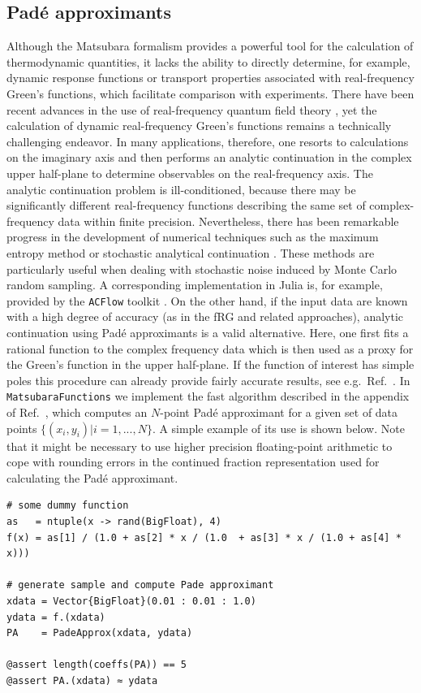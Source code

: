 \documentclass{SciPost}
\begin{document}
\subsection{Pad\'e approximants}
\label{subsec:pade}

Although the Matsubara formalism provides a powerful tool for the calculation of thermodynamic quantities, it lacks the ability to directly determine, for example, dynamic response functions or transport properties associated with real-frequency Green's functions, which facilitate comparison with experiments. There have been recent advances in the use of real-frequency quantum field theory \cite{jakobs2010, schimmel2017, weidinger2021, ge2023}, yet the calculation of dynamic real-frequency Green's functions remains a technically challenging endeavor. In many applications, therefore, one resorts to calculations on the imaginary axis and then performs an analytic continuation in the complex upper half-plane to determine observables on the real-frequency axis. The analytic continuation problem is ill-conditioned, because there may be significantly different real-frequency functions describing the same set of complex-frequency data within finite precision. Nevertheless, there has been remarkable progress in the development of numerical techniques such as the maximum entropy method \cite{jarell1996, bergeron2016, goulko2017} or stochastic analytical continuation \cite{beach2004, sandvik2016}. These methods are particularly useful when dealing with stochastic noise induced by Monte Carlo random sampling. A corresponding implementation in Julia is, for example, provided by the \texttt{ACFlow} toolkit \cite{huang2022}. On the other hand, if the input data are known with a high degree of accuracy (as in the fRG and related approaches), analytic continuation using Pad\'e approximants is a valid alternative. Here, one first fits a rational function to the complex frequency data which is then used as a proxy for the Green's function in the upper half-plane. If the function of interest has simple poles this procedure can already provide fairly accurate results, see e.g.~Ref.~\cite{karrasch2008}. In \texttt{MatsubaraFunctions} we implement the fast algorithm described in the appendix of Ref.~\cite{vidberg1977}, which computes an $N$-point Pad\'e approximant for a given set of data points $\{(x_i, y_i) | i = 1, ..., N \}$. A simple example of its use is shown below. Note that it might be necessary to use higher precision floating-point arithmetic to cope with rounding errors in the continued fraction representation used for calculating the Pad\'e approximant.
%
\begin{verbatim}
# some dummy function
as   = ntuple(x -> rand(BigFloat), 4)
f(x) = as[1] / (1.0 + as[2] * x / (1.0  + as[3] * x / (1.0 + as[4] * x)))

# generate sample and compute Pade approximant
xdata = Vector{BigFloat}(0.01 : 0.01 : 1.0)
ydata = f.(xdata)
PA    = PadeApprox(xdata, ydata)

@assert length(coeffs(PA)) == 5
@assert PA.(xdata) ≈ ydata
\end{verbatim}
\end{document}
